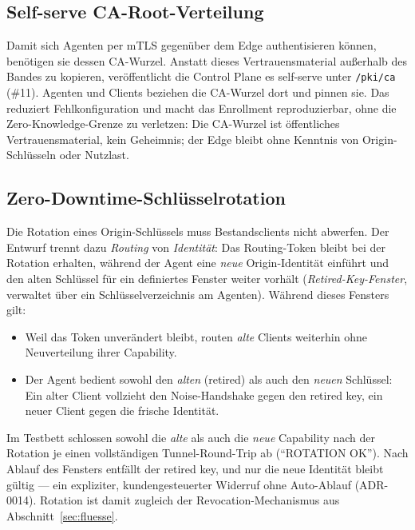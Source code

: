\subsection{Self-serve CA-Root-Verteilung}
\label{subsec:pki}

Damit sich Agenten per mTLS gegenüber dem Edge authentisieren können, benötigen
sie dessen CA-Wurzel. Anstatt dieses Vertrauensmaterial außerhalb des Bandes zu
kopieren, veröffentlicht die Control Plane es self-serve unter \texttt{/pki/ca}
(\#11). Agenten und Clients beziehen die CA-Wurzel dort und pinnen sie. Das
reduziert Fehlkonfiguration und macht das Enrollment reproduzierbar, ohne die
Zero-Knowledge-Grenze zu verletzen: Die CA-Wurzel ist öffentliches
Vertrauensmaterial, kein Geheimnis; der Edge bleibt ohne Kenntnis von
Origin-Schlüsseln oder Nutzlast.

\subsection{Zero-Downtime-Schlüsselrotation}
\label{subsec:rotation}

Die Rotation eines Origin-Schlüssels muss Bestandsclients nicht abwerfen. Der
Entwurf trennt dazu \emph{Routing} von \emph{Identität}: Das Routing-Token
bleibt bei der Rotation erhalten, während der Agent eine \emph{neue}
Origin-Identität einführt und den alten Schlüssel für ein definiertes Fenster
weiter vorhält (\emph{Retired-Key-Fenster}, verwaltet über ein
Schlüsselverzeichnis am Agenten). Während dieses Fensters gilt:

\begin{itemize}
  \item Weil das Token unverändert bleibt, routen \emph{alte} Clients weiterhin
    ohne Neuverteilung ihrer Capability.
  \item Der Agent bedient sowohl den \emph{alten} (retired) als auch den
    \emph{neuen} Schlüssel: Ein alter Client vollzieht den Noise-Handshake gegen
    den retired key, ein neuer Client gegen die frische Identität.
\end{itemize}

Im Testbett schlossen sowohl die \emph{alte} als auch die \emph{neue} Capability
nach der Rotation je einen vollständigen Tunnel-Round-Trip ab
(\enquote{ROTATION OK}). Nach Ablauf des Fensters entfällt der retired key, und
nur die neue Identität bleibt gültig --- ein expliziter, kundengesteuerter
Widerruf ohne Auto-Ablauf (ADR-0014). Rotation ist damit zugleich der
Revocation-Mechanismus aus Abschnitt~\ref{sec:fluesse}.

